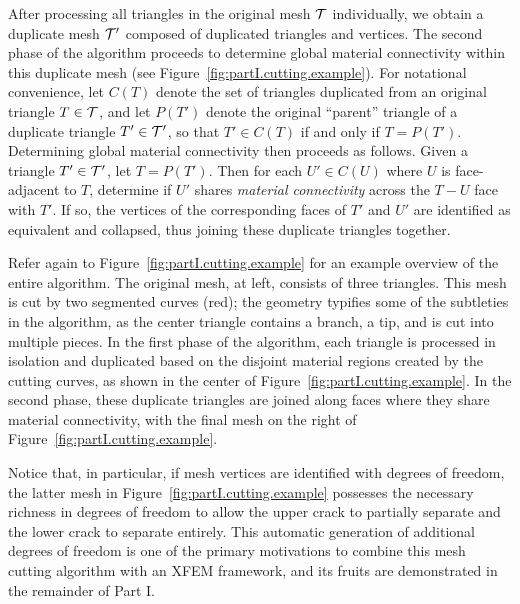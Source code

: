 After processing all triangles in the original mesh $\mathcal{T}$ individually, we obtain a duplicate mesh $\mathcal{T}'$ composed of duplicated triangles and vertices. The second phase of the algorithm proceeds to determine global material connectivity within this duplicate mesh (see Figure~\ref{fig:partI.cutting.example}). For notational convenience, let $C(T)$ denote the set of triangles duplicated from an original triangle $T \in \mathcal{T}$, and let $P(T')$ denote the original ``parent'' triangle of a duplicate triangle $T' \in \mathcal{T}'$, so that $T' \in C(T)$ if and only if $T = P(T')$. Determining global material connectivity then proceeds as follows. Given a triangle $T' \in \mathcal{T}'$, let $T = P(T')$. Then for each $U' \in C(U)$ where $U$ is face-adjacent to $T$, determine if $U'$ shares \emph{material connectivity} across the $T-U$ face with $T'$. If so, the vertices of the corresponding faces of $T'$ and $U'$ are identified as equivalent and collapsed, thus joining these duplicate triangles together.

Refer again to Figure~\ref{fig:partI.cutting.example} for an example overview of the entire algorithm. The original mesh, at left, consists of three triangles. This mesh is cut by two segmented curves (red); the geometry typifies some of the subtleties in the algorithm, as the center triangle contains a branch, a tip, and is cut into multiple pieces. In the first phase of the algorithm, each triangle is processed in isolation and duplicated based on the disjoint material regions created by the cutting curves, as shown in the center of Figure~\ref{fig:partI.cutting.example}. In the second phase, these duplicate triangles are joined along faces where they share material connectivity, with the final mesh on the right of Figure~\ref{fig:partI.cutting.example}.

Notice that, in particular, if mesh vertices are identified with degrees of freedom, the latter mesh in Figure~\ref{fig:partI.cutting.example} possesses the necessary richness in degrees of freedom to allow the upper crack to partially separate and the lower crack to separate entirely. This automatic generation of additional degrees of freedom is one of the primary motivations to combine this mesh cutting algorithm with an XFEM framework, and its fruits are demonstrated in the remainder of Part I.

\renewcommand{\thechapter}{\arabic{chapter}}
